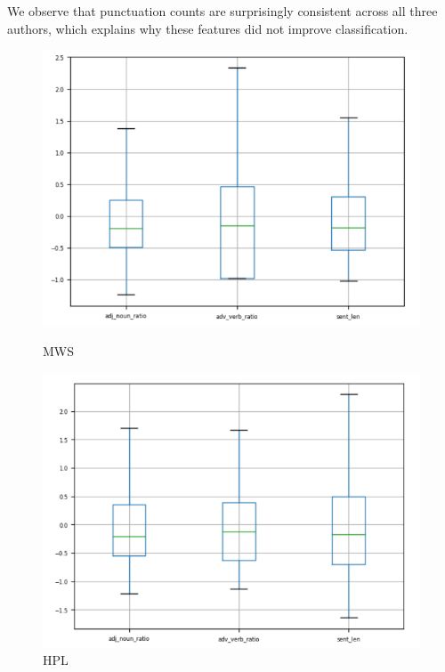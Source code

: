 \documentclass[8pt]{article}
\begin{document}
We observe that punctuation counts are surprisingly consistent across all three authors, which explains why these features did not improve classification.
\begin{figure}[h]
  \begin{multicols}{3}
      \includegraphics[width=\linewidth]{images/ratio_mws.png}\par\caption{MWS}
      \includegraphics[width=\linewidth]{images/ratio_hpl.png}\par\caption{HPL}

\end{multicols}
\end{figure}
\end{document}
